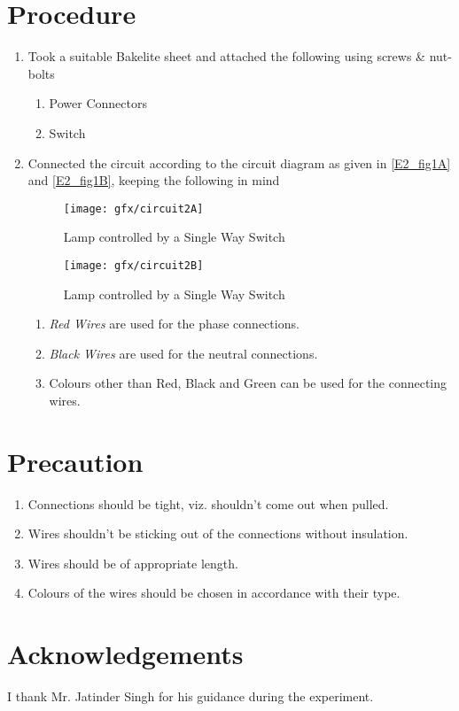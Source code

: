 \section{Procedure}
	\begin{enumerate}
		\item Took a suitable Bakelite sheet and attached the following using screws \& nut-bolts
			\begin{enumerate}
				\item Power Connectors
				\item Switch
			\end{enumerate} 
		\item Connected the circuit according to the circuit diagram as given in \autoref{E2_fig1A} and \autoref{E2_fig1B}, keeping the following in mind
		\begin{figure}[bth]
			\begin{center}
				\texttt{[image: gfx/circuit2A]}
			\end{center}
		\caption[Lamp - Single Way Switch]{Lamp controlled by a Single Way Switch}\label{E2_fig1A}
		\end{figure}

		\begin{figure}[bth]
			\begin{center}
				\texttt{[image: gfx/circuit2B]}
			\end{center}
		\caption[Lamp - Single Way Switch]{Lamp controlled by a Single Way Switch}\label{E2_fig1B}
		\end{figure}

			\begin{enumerate}
				\item \emph{Red Wires} are used for the phase connections.
				\item \emph{Black Wires} are used for the neutral connections.
				\item Colours other than Red, Black and Green can be used for the connecting wires.
			\end{enumerate}	
	\end{enumerate}
\section{Precaution}
	\begin{enumerate}
		\item Connections should be tight, viz. shouldn't come out when pulled.
		\item Wires shouldn't be sticking out of the connections without insulation.
		\item Wires should be of appropriate length.
		\item Colours of the wires should be chosen in accordance with their type.
	\end{enumerate}	
\section{Acknowledgements}
I thank Mr. Jatinder Singh for his guidance during the experiment.